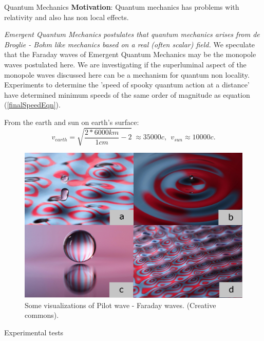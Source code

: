 \documentclass[final]{beamer}
\newlength{\colwidth}
\begin{document}
\begin{frame}[t]
\begin{columns}[t]
\begin{column}{\colwidth}
  \begin{block}{Quantum Mechanics}
  \textbf{Motivation}: Quantum mechanics has problems with relativity and also has non local effects.
  
  \textit{Emergent Quantum Mechanics postulates that quantum mechanics arises from de Broglie - Bohm like mechanics based on a real (often scalar) field\cite{Bush2015a}.} We speculate that the Faraday waves of Emergent Quantum Mechanics may be the monopole waves postulated here.  We are investigating if the superluminal aspect of the monopole waves discussed here can be a mechanism for quantum non locality. Experiments to determine the 'speed of spooky quantum action at a distance'\cite{salartTestingSpeedSpooky2008a} have determined minimum speeds of the same order of magnitude as equation (\ref{finalSpeedEqn}).
   
From the earth and sun on earth's surface:
  \begin{equation}
 v_{earth} = \sqrt{\frac{2*6000km}{1 cm} - 2} \ \approx 35000c,\ \ v_{sun} \approx 10000c. 
\end{equation}

      \begin{figure}
\includegraphics[width=0.6\columnwidth]{bush-waves.png}
\caption{Some visualizations of Pilot wave - Faraday waves. (Creative commons). \cite{Bush2015a}}
\label{bush-faraday}
\end{figure} 

  
\begin{exampleblock}{Experimental tests}


\end{exampleblock}
\end{block}
\end{column}
\end{columns}
\end{frame}
\end{document}
